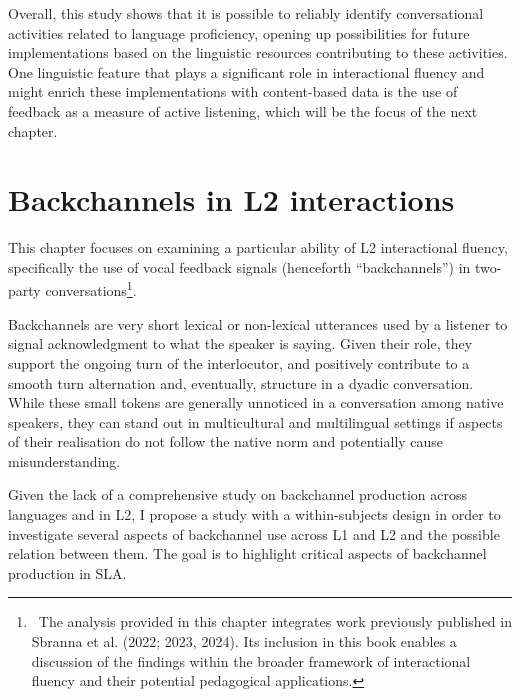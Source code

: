 \begin{styleStandard}
Overall, this study shows that it is possible to reliably identify conversational activities related to language proficiency, opening up possibilities for future implementations based on the linguistic resources contributing to these activities. One linguistic feature that plays a significant role in interactional fluency and might enrich these implementations with content-based data is the use of feedback as a measure of active listening, which will be the focus of the next chapter.
\end{styleStandard}

\clearpage\section[Backchannels in L2 interactions]{Backchannels in L2 interactions}
\hypertarget{Toc191305941}{}\begin{styleStandard}
This chapter focuses on examining a particular ability of L2 interactional fluency, specifically the use of vocal feedback signals (henceforth “backchannels”) in two-party conversations\footnote{\ The analysis provided in this chapter integrates work previously published in Sbranna et al. (2022; 2023, 2024). Its inclusion in this book enables a discussion of the findings within the broader framework of interactional fluency and their potential pedagogical applications.}. 
\end{styleStandard}

\begin{styleStandard}
Backchannels are very short lexical or non-lexical utterances used by a listener to signal acknowledgment to what the speaker is saying. Given their role, they support the ongoing turn of the interlocutor, and positively contribute to a smooth turn alternation and, eventually, structure in a dyadic conversation. While these small tokens are generally unnoticed in a conversation among native speakers, they can stand out in multicultural and multilingual settings if aspects of their realisation do not follow the native norm and potentially cause misunderstanding. 
\end{styleStandard}

\begin{styleStandard}
Given the lack of a comprehensive study on backchannel production across languages and in L2, I propose a study with a within-subjects design in order to investigate several aspects of backchannel use across L1 and L2 and the possible relation between them. The goal is to highlight critical aspects of backchannel production in SLA. 
\end{styleStandard}

